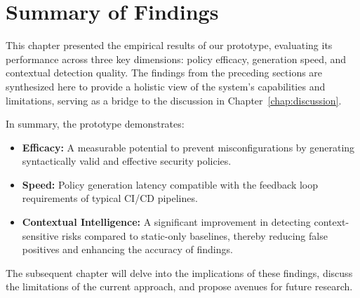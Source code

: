 \section{Summary of Findings}\label{sec:summary-findings}

This chapter presented the empirical results of our prototype, evaluating its performance across three key dimensions: policy efficacy, generation speed, and contextual detection quality. The findings from the preceding sections are synthesized here to provide a holistic view of the system's capabilities and limitations, serving as a bridge to the discussion in Chapter~\ref{chap:discussion}.

In summary, the prototype demonstrates:
\begin{itemize}
    \item \textbf{Efficacy:} A measurable potential to prevent misconfigurations by generating syntactically valid and effective security policies.
    \item \textbf{Speed:} Policy generation latency compatible with the feedback loop requirements of typical CI/CD pipelines.
    \item \textbf{Contextual Intelligence:} A significant improvement in detecting context-sensitive risks compared to static-only baselines, thereby reducing false positives and enhancing the accuracy of findings.
\end{itemize}

The subsequent chapter will delve into the implications of these findings, discuss the limitations of the current approach, and propose avenues for future research.